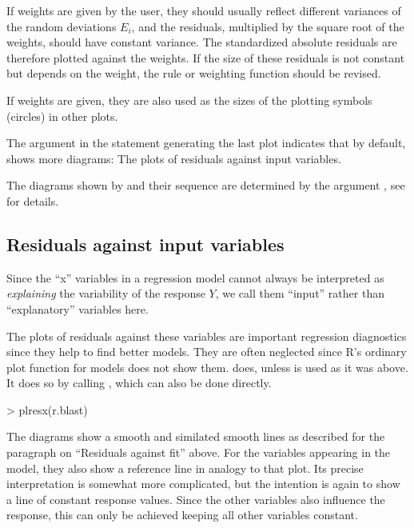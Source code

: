 \documentclass[11pt]{article}
\begin{document}
If weights are given by the user, they should usually reflect different
variances of the random deviations $E_i$, and the residuals, multiplied by the
square root of the weights, should have constant variance.
The standardized absolute residuals are therefore plotted against the weights.
If the size of these residuals is not constant but depends on the weight, 
the rule or weighting function should be revised.

If weights are given, they are also used as the sizes of the plotting
symbols (circles) in other plots.


The argument  in the statement generating the last plot
indicates that by default,  
shows more diagrams: The plots of residuals against input variables.

The diagrams shown by  and their sequence are determined by
the argument , see  for details.

\subsection{Residuals against input variables}
Since the ``x'' variables in a regression model cannot always be
interpreted as \emph{explaining} the variability of the response $Y$,
we call them ``input'' rather than ``explanatory'' variables here.

The plots of residuals against these variables are important regression
diagnostics since they help to find better models. 
They are often neglected since R's ordinary plot function
for models does not show them. 
 does, unless  is used as it was above.
It does so by calling , which can also be done directly.

\begin{Schunk}
\begin{Sinput}
> plresx(r.blast)
\end{Sinput}
\end{Schunk}
The diagrams show a smooth and similated smooth lines as described
for the paragraph on ``Residuals against fit'' above.
For the variables appearing in the model, they also show a reference line 
in analogy to that plot.
Its precise interpretation is somewhat more complicated, but the intention
is again to show a line of constant response values.
Since the other variables also influence the response, 
this can only be achieved keeping all other variables constant.
\end{document}
